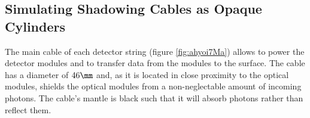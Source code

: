 
\subsection{Simulating Shadowing Cables as Opaque Cylinders}
\label{sec:cables}


The main cable of each detector string (figure \ref{fig:ahyoi7Ma}) allows to power the detector modules and to transfer data from the modules to the surface. The cable has a diameter of $46\mm$ \cite{instrumentation} and, as it is located in close proximity to the optical modules, shields the optical modules from a non-neglectable amount of incoming photons. The cable's mantle is black such that it will absorb photons rather than reflect them.

